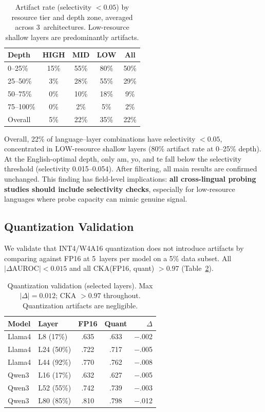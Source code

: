 \documentclass[11pt,a4paper]{article}
\begin{document}
\begin{table}[t]
\centering
\small
\begin{tabular}{lcccc}
\toprule
\textbf{Depth} & \textbf{HIGH} & \textbf{MID} & \textbf{LOW} & \textbf{All} \\
\midrule
0--25\%  & 15\% & 55\% & 80\% & 50\% \\
25--50\% & 3\% & 28\% & 55\% & 29\% \\
50--75\% & 0\% & 10\% & 18\% & 9\% \\
75--100\% & 0\% & 2\% & 5\% & 2\% \\
\midrule
Overall & 5\% & 22\% & 35\% & 22\% \\
\bottomrule
\end{tabular}
\caption{Artifact rate (selectivity $< 0.05$) by resource tier and depth zone, averaged across 3~architectures. Low-resource shallow layers are predominantly artifacts.}
\label{tab:controls}
\end{table}

Overall, 22\% of language--layer combinations have selectivity $< 0.05$, concentrated in LOW-resource shallow layers (80\% artifact rate at 0--25\% depth). At the English-optimal depth, only am, yo, and te fall below the selectivity threshold (selectivity 0.015--0.054). After filtering, all main results are confirmed unchanged. This finding has field-level implications: \textbf{all cross-lingual probing studies should include selectivity checks}, especially for low-resource languages where probe capacity can mimic genuine signal.

\subsection{Quantization Validation}
\label{sec:quantization}

We validate that INT4/W4A16 quantization does not introduce artifacts by comparing against FP16 at 5~layers per model on a 5\% data subset. All $|\Delta\text{AUROC}| < 0.015$ and all CKA(FP16, quant) $> 0.97$ (Table~\ref{tab:quant}).

\begin{table}[t]
\centering
\small
\begin{tabular}{llccr}
\toprule
\textbf{Model} & \textbf{Layer} & \textbf{FP16} & \textbf{Quant} & \textbf{$\Delta$} \\
\midrule
Llama4 & L8 (17\%) & .635 & .633 & $-$.002 \\
Llama4 & L24 (50\%) & .722 & .717 & $-$.005 \\
Llama4 & L44 (92\%) & .770 & .762 & $-$.008 \\
\midrule
Qwen3 & L16 (17\%) & .632 & .627 & $-$.005 \\
Qwen3 & L52 (55\%) & .742 & .739 & $-$.003 \\
Qwen3 & L80 (85\%) & .810 & .798 & $-$.012 \\
\bottomrule
\end{tabular}
\caption{Quantization validation (selected layers). Max $|\Delta| = 0.012$; CKA $> 0.97$ throughout. Quantization artifacts are negligible.}
\label{tab:quant}
\end{table}
\end{document}
